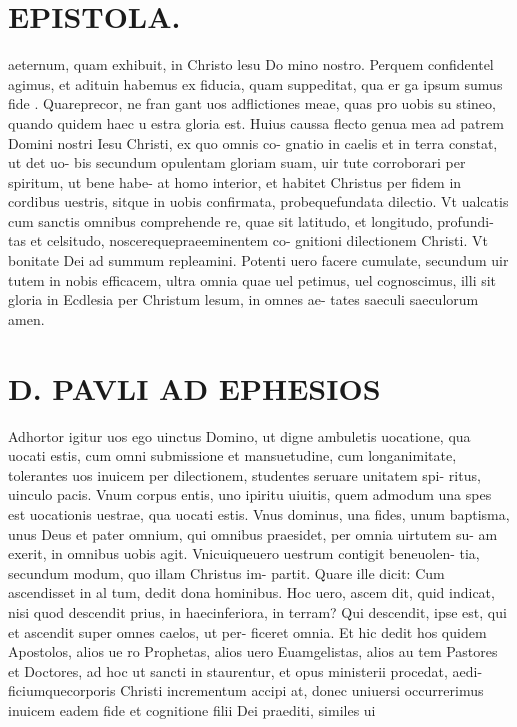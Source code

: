 \documentclass{article}
\begin{document}
\begin{pages}
\section*{EPISTOLA.  }
\marginpar{[ p.12 ]}
\marginpar{[ p.5.  ]}
\marginpar{[ p.6.  ]}
\marginpar{[ p.7. ]}
\marginpar{[ p.8. ]}
\marginpar{[ p.9. ]}\pstart aeternum, quam exhibuit, in Christo lesu Do mino nostro.  \pend\pstart Perquem confidentel agimus, et adituin habemus ex fiducia, quam suppeditat, qua er ga ipsum sumus fide . Quareprecor, ne fran gant uos adflictiones meae, quas pro uobis su stineo, quando quidem haec u estra gloria est.  \pend\pstart Huius caussa flecto genua mea ad patrem Domini nostri Iesu Christi, ex quo omnis co- gnatio in caelis et in terra constat, ut det uo- bis secundum opulentam gloriam suam, uir tute corroborari per spiritum, ut bene habe- at homo interior, et habitet Christus per fidem in cordibus uestris, sitque in uobis confirmata, probequefundata dilectio.  \pend\pstart Vt ualcatis cum sanctis omnibus comprehende re, quae sit latitudo, et longitudo, profundi- tas et celsitudo, noscerequepraeeminentem co- gnitioni dilectionem Christi. Vt bonitate Dei ad summum repleamini.  \pend\pstart Potenti uero facere cumulate, secundum uir tutem in nobis efficacem, ultra omnia quae uel petimus, uel cognoscimus, illi sit gloria in Ecdlesia per Christum lesum, in omnes ae- tates saeculi saeculorum amen.  \pend
\section*{D. PAVLI AD EPHESIOS }
\marginpar{[ p.2. ]}
\marginpar{[ p.3.  ]}
\marginpar{[ p.4.  ]}\pstart Adhortor igitur uos ego uinctus Domino, ut digne ambuletis uocatione, qua uocati estis, cum omni submissione et mansuetudine, cum longanimitate, tolerantes uos inuicem per dilectionem, studentes seruare unitatem spi- ritus, uinculo pacis.  \pend\pstart Vnum corpus entis, uno ipiritu uiuitis, quem admodum una spes est uocationis uestrae, qua uocati estis. Vnus dominus, una fides, unum baptisma, unus Deus et pater omnium, qui omnibus praesidet, per omnia uirtutem su- am exerit, in omnibus uobis agit.  \pend\pstart Vnicuiqueuero uestrum contigit beneuolen- tia, secundum modum, quo illam Christus im- partit. Quare ille dicit: Cum ascendisset in al tum, dedit dona hominibus. Hoc uero, ascem dit, quid indicat, nisi quod descendit prius, in haecinferiora, in terram? Qui descendit, ipse est, qui et ascendit super omnes caelos, ut per- ficeret omnia.  \pend\pstart Et hic dedit hos quidem Apostolos, alios ue ro Prophetas, alios uero Euamgelistas, alios au tem Pastores et Doctores, ad hoc ut sancti in staurentur, et opus ministerii procedat, aedi- ficiumquecorporis Christi incrementum accipi at, donec uniuersi occurrerimus inuicem eadem fide et cognitione filii Dei praediti, similes ui  \pend

\end{pages}
\end{document}
